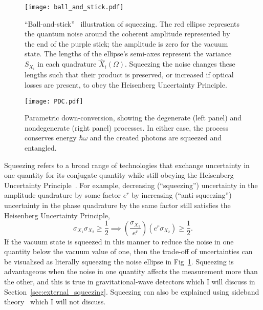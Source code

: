 \begin{figure}
	\centering
	\texttt{[image: ball\_and\_stick.pdf]}
	\caption{ ``Ball-and-stick''~\cite{} illustration of squeezing. The red ellipse represents the quantum noise around the coherent amplitude represented by the end of the purple stick; the amplitude is zero for the vacuum state. The lengths of the ellipse's semi-axes represent the variance $S_{X_i}$ in each quadrature $\hat X_i(\Omega)$. Squeezing the noise changes these lengths such that their product is preserved, or increased if optical losses are present, to obey the Heisenberg Uncertainty Principle.}
	\label{fig:ballandstick_simple}
\end{figure}
\begin{figure}
	\centering
	\texttt{[image: PDC.pdf]}
	\caption{ Parametric down-conversion, showing the degenerate (left panel) and nondegenerate (right panel) processes. In either case, the process conserves energy $\hbar\omega$ and the created photons are squeezed and entangled.}
	\label{fig:PDC_deg_and_nondeg}
\end{figure}

Squeezing refers to a broad range of technologies that exchange uncertainty in one quantity for its conjugate quantity while still obeying the Heisenberg Uncertainty Principle~\cite{}. For example, decreasing (``squeezing'') uncertainty in the amplitude quadrature by some factor $e^r$ by increasing (``anti-squeezing'') uncertainty in the phase quadrature by the same factor still satisfies the Heisenberg Uncertainty Principle, 
\begin{equation}
\sigma_{X_1}\sigma_{X_2}\geq\frac{1}{2}\implies (\frac{\sigma_{X_1}}{e^r}) (e^r\sigma_{X_2})\geq\frac{1}{2}\label{eq:HUP_squeezed}.
\end{equation} 
If the vacuum state is squeezed in this manner to reduce the noise in one quantity below the vacuum value of one, then the trade-off of uncertainties can be visualised as literally squeezing the noise ellipse in Fig~\ref{fig:ballandstick_simple}.
Squeezing is advantageous when the noise in one quantity affects the measurement more than the other, and this is true in gravitational-wave detectors which I will discuss in Section~\ref{sec:external_squeezing}.
Squeezing can also be explained using sideband theory~\cite{} which I will not discuss.

